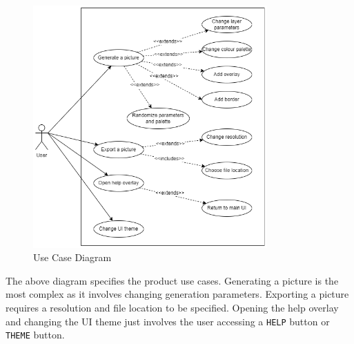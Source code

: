 \documentclass[12pt, titlepage]{article}
\begin{document}
\begin{figure}[H]
    \centering
    \includegraphics[width=0.8\textwidth]{UseCasesUpdated.png}
    \caption{Use Case Diagram}
    \label{fig:context}
\end{figure}

The above diagram specifies the product use cases. Generating a picture is the most complex as it involves changing generation parameters. Exporting a picture requires a resolution and file location to be specified. Opening the help overlay and changing the UI theme just involves the user accessing a \texttt{HELP} button or \texttt{THEME} button.
\end{document}
